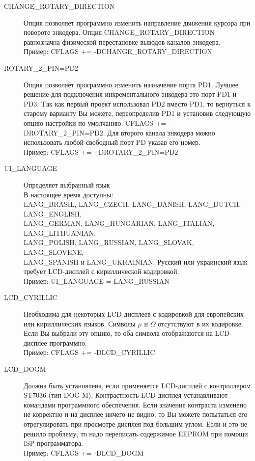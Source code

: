 \begin{description}
  \item[CHANGE\_ROTARY\_DIRECTION] Опция позволяет программно изменить направление движения курсора при повороте 
энкодера. Опция CHANGE\_ROTARY\_DIRECTION равнозначна физической перестановке выводов каналов энкодера.\\
Пример: CFLAGS += -DCHANGE\_ROTARY\_DIRECTION

  \item[ROTARY\_2\_PIN=PD2] Опция позволяет программно изменить назначение порта PD1. Лучшее решение для подключения 
инкрементального энкодера это порт PD1 и PD3. Tак как первый проект использовал PD2 вместо PD1, то 
вернуться к старому варианту Вы можете, переопределив PD1 и установив следующую опцию настройки по умолчанию: 
CFLAGS += -DROTARY\_2\_PIN=PD2. Для второго канала энкодера можно использовать любой 
свободный порт PD указав его номер.\\
Пример: CFLAGS += - DROTARY\_2\_PIN=PD2
 
  \item[UI\_LANGUAGE] Определяет выбранный язык\\
В настоящее время доступны:\\
    LANG\_BRASIL, LANG\_CZECH, LANG\_DANISH, LANG\_DUTCH, LANG\_ENGLISH, \\
    LANG\_GERMAN, LANG\_HUNGARIAN, LANG\_ITALIAN, LANG\_LITHUANIAN, \\
    LANG\_POLISH, LANG\_RUSSIAN, LANG\_SLOVAK, LANG\_SLOVENE, \\
    LANG\_SPANISH и LANG\_UKRAINIAN. Русский или украинский язык требует LCD-дисплей с 
кириллической кодировкой.\\
Пример:  UI\_LANGUAGE = LANG\_RUSSIAN

  \item[LCD\_CYRILLIC] Необходима для некоторых LCD-дисплеев с кодировкой для европейских или кириллических языков.
Символы \(\mu\) и \(\Omega\) отсутствуют в их кодировке. Если Вы выбрали эту опцию, то оба символа 
отображаются на LCD-дисплее программно.\\
Пример: CFLAGS += -DLCD\_CYRILLIC

  \item[LCD\_DOGM] Должна быть установлена, если применяется LCD-дисплей с контроллером ST7036 (тип DOG-M). 
Контрастность LCD-дисплея устанавливают командами программного обеспечения. 
Если значение контраста изменено не корректно и на дисплее ничего не видно, то Вы можете попытаться 
его отрегулировать при просмотре дисплея под большим углом. Если и это не решило проблему, то надо переписать
содержимое EEPROM при помощи ISP программатора.\\
Пример: CFLAGS += -DLCD\_DOGM


\end{description}
